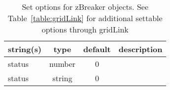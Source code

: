 \begin{table}[ht]
\centering
\begin{tabular}{p{5cm} c c p{7cm}}
\hline
string(s) & type & default & description \\
\hline
status & number & 0 & \\
status & string & 0 & \\
\hline
\end{tabular}
\caption{Set options for zBreaker objects. See Table~\ref{table:gridLink} for additional settable options through gridLink}
\label{table:zBreaker}
\end{table}

